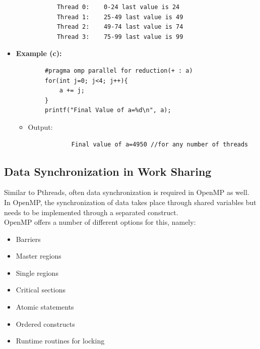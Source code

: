 \documentclass[12pt, a4paper]{report}
\begin{document}
\begin{itemize}
\begin{itemize}
\begin{verbatim}
        Thread 0:    0-24 last value is 24
        Thread 1:    25-49 last value is 49
        Thread 2:    49-74 last value is 74
        Thread 3:    75-99 last value is 99
        \end{verbatim}
    \end{itemize}
    \item {\bfseries{Example (c):}}
    \begin{verbatim}
        #pragma omp parallel for reduction(+ : a)
        for(int j=0; j<4; j++){
            a += j;
        }
        printf("Final Value of a=%d\n", a);
    \end{verbatim}
    \begin{itemize}
        \item {Output:}
        \begin{verbatim}
            Final value of a=4950 //for any number of threads
        \end{verbatim}
    \end{itemize}
\end{itemize}

\subsection{Data Synchronization in Work Sharing}
Similar to Pthreads, often data synchronization is required in OpenMP as well. In OpenMP, the synchronization of data takes place through shared
variables but needs to be implemented through a separated construct. \\
OpenMP offers a number of different options for this, namely:
\begin{itemize}
    \item Barriers
    \item Master regions
    \item Single regions
    \item Critical sections
    \item Atomic statements
    \item Ordered constructs
    \item Runtime routines for locking
\end{itemize}
\end{document}
